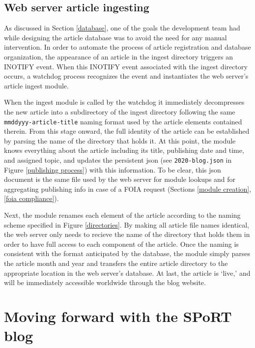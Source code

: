 \documentclass[12pt]{article}
\begin{document}
\subsection{Web server article ingesting}
\label{web server publishing}

As discussed in Section \ref{database}, one of the goals the development team had while designing the article database was to avoid the need for any manual intervention. In order to automate the process of article registration and database organization, the appearance of an article in the ingest directory triggers an INOTIFY event. When this INOTIFY event associated with the ingest directory occurs, a watchdog process recognizes the event and instantiates the web server's article ingest module.

When the ingest module is called by the watchdog it immediately decompresses the new article into a subdirectory of the ingest directory following the same \texttt{mmddyyy-article-title} naming format used by the article elements contained therein. From this stage onward, the full identity of the article can be established by parsing the name of the directory that holds it. At this point, the module knows everything about the article including its title, publishing date and time, and assigned topic, and updates the persistent json (see \texttt{2020-blog.json} in Figure \ref{publishing process}) with this information. To be clear, this json document is the same file used by the web server for module lookups and for aggregating publishing info in case of a FOIA request (Sections \ref{module creation}, \ref{foia compliance}).

Next, the module renames each element of the article according to the naming scheme specified in Figure \ref{directories}. By making all article file names identical, the web server only needs to recieve the name of the directory that holds them in order to have full access to each component of the article. Once the naming is consistent with the format anticipated by the database, the module simply parses the article month and year and transfers the entire article directory to the appropriate location in the web server's database. At last, the article is `live,' and will be immediately accessible worldwide through the blog website.

\section{Moving forward with the SPoRT blog}
\end{document}
